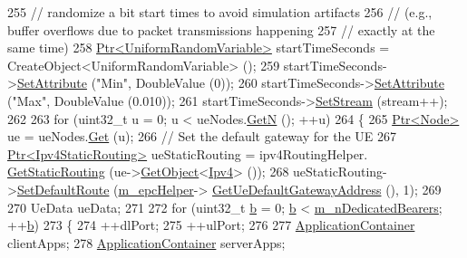 \begin{DoxyCode}
255       \textcolor{comment}{// randomize a bit start times to avoid simulation artifacts}
256       \textcolor{comment}{// (e.g., buffer overflows due to packet transmissions happening}
257       \textcolor{comment}{// exactly at the same time) }
258       \hyperlink{classns3_1_1Ptr}{Ptr<UniformRandomVariable>} startTimeSeconds = 
      CreateObject<UniformRandomVariable> ();
259       startTimeSeconds->\hyperlink{classns3_1_1ObjectBase_ac60245d3ea4123bbc9b1d391f1f6592f}{SetAttribute} (\textcolor{stringliteral}{"Min"}, DoubleValue (0));
260       startTimeSeconds->\hyperlink{classns3_1_1ObjectBase_ac60245d3ea4123bbc9b1d391f1f6592f}{SetAttribute} (\textcolor{stringliteral}{"Max"}, DoubleValue (0.010));
261       startTimeSeconds->\hyperlink{classns3_1_1RandomVariableStream_add11aaf975607746b7e271d300659a94}{SetStream} (stream++);      
262 
263       \textcolor{keywordflow}{for} (uint32\_t u = 0; u < ueNodes.\hyperlink{classns3_1_1NodeContainer_aed647ac56d0407a7706aba02eb44b951}{GetN} (); ++u)
264         \{
265           \hyperlink{classns3_1_1Ptr}{Ptr<Node>} ue = ueNodes.\hyperlink{classns3_1_1NodeContainer_a9ed96e2ecc22e0f5a3d4842eb9bf90bf}{Get} (u);
266           \textcolor{comment}{// Set the default gateway for the UE}
267           \hyperlink{classns3_1_1Ptr}{Ptr<Ipv4StaticRouting>} ueStaticRouting = ipv4RoutingHelper.
      \hyperlink{classns3_1_1Ipv4StaticRoutingHelper_a731206e50d305695dac7fb2ef963a4bb}{GetStaticRouting} (ue->\hyperlink{classns3_1_1Object_a13e18c00017096c8381eb651d5bd0783}{GetObject}<\hyperlink{classns3_1_1Ipv4}{Ipv4}> ());
268           ueStaticRouting->\hyperlink{classns3_1_1Ipv4StaticRouting_aee30fa3246c2b42f122dabdff2725331}{SetDefaultRoute} (\hyperlink{classLteX2HandoverTestCase_a17d20243fe4f7a49fe7fa1eeeff9f1f5}{m\_epcHelper}->
      \hyperlink{classns3_1_1PointToPointEpcHelper_a9160d83b92d5ea373abcd627f5d784f5}{GetUeDefaultGatewayAddress} (), 1);
269 
270           UeData ueData;
271      
272           \textcolor{keywordflow}{for} (uint32\_t \hyperlink{buildings__pathloss_8m_a21ad0bd836b90d08f4cf640b4c298e7c}{b} = 0; \hyperlink{buildings__pathloss_8m_a21ad0bd836b90d08f4cf640b4c298e7c}{b} < \hyperlink{classLteX2HandoverTestCase_af2146e1a8c7985f642c7fb69ad7ec345}{m\_nDedicatedBearers}; ++\hyperlink{buildings__pathloss_8m_a21ad0bd836b90d08f4cf640b4c298e7c}{b})
273             \{
274               ++dlPort;
275               ++ulPort;
276 
277               \hyperlink{classns3_1_1ApplicationContainer}{ApplicationContainer} clientApps;
278               \hyperlink{classns3_1_1ApplicationContainer}{ApplicationContainer} serverApps;

\end{DoxyCode}
